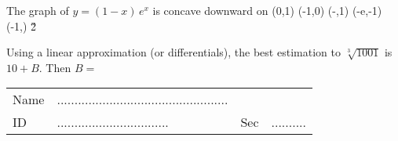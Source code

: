 \documentclass[amsfonts,bezier,leqno,fleqn,12pt,a4paper]{article}
\begin{document}
{{\begin{large}
\newpage



\item %
The graph of $y=(1-x)\,e^x$ is concave downward on
\sc
\be
(0,1)
\ee
\be
(-1,0)
\ee
\be
(-\infty,1)
\ee
\be
(-e,-1)
\ee
\be
\displaystyle (-1,\infty)
\ee
\v2



\item %
Using a linear approximation (or differentials), the best estimation to $\sqrt[3]{1001}$ is $10+B.$ Then $B=$
\sc
\be
\displaystyle {}
\ee
\be
\displaystyle {}
\ee
\be
\displaystyle {}
\ee
\be
\displaystyle {}
\ee
\be
\displaystyle {}
\ee

\newpage



\en
\end{large}

\newpage


\renewcommand{\thepage}{\noindent Math 101, Final Exam, Term 162 \hfill Answer Sheet  \hfill {\bf \fbox{002}}}

\begin{Large}


\begin{tabular}{llll}
Name & .................................................& & \\
ID &   ................................& Sec & ..........\\
\end{tabular}

\vspace{10mm}



\end{Large}}}
\end{document}
